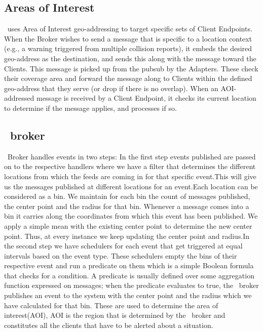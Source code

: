 \subsection{Areas of Interest}
\label{sec:aoi}

\name~uses Area of Interest geo-addressing to target specific sets
of Client Endpoints.  When the Broker wishes to send a message that is
specific to a location context (e.g., a warning triggered from
multiple collision reports), it embeds the desired geo-address as the
destination, and sends this along with the message toward the
Clients. This message is picked up from the pubsub by the Adapters.
These check their coverage area and forward the message along to
Clients within the defined geo-address that they serve (or drop if
there is no overlap).  When an AOI-addressed message is received by a
Client Endpoint, it checks its current location to determine if the
message applies, and processes if so.

\subsection{\name~broker}
  
\name~Broker handles events in two steps: In the first step events
published are passed on to the respective handlers where we have a
filter that determines the different locations from which the feeds
are coming in for that specific event.This will give us the messages
published at different locations for an event.Each location can be
considered as a bin. We maintain for each bin the count of messages
published, the center point and the radius for that bin.  Whenever a
message comes into a bin it carries along the coordinates from which
this event has been published. We apply a simple mean with the
existing center point to determine the new center point. Thus, at
every instance we keep updating the center point and radius.In the
second step we have schedulers for each event that get triggered at
equal intervals based on the event type.  These schedulers empty the
bins of their respective event and run a predicate on them which is a
simple Boolean formula that checks for a condition.  A predicate is
usually defined over some aggregation function expressed on messages;
when the predicate evaluates to true, the \name~broker publishes an
event to the system with the center point and the radius which we have
calculated for that bin. These are used to determine the area of
interest(AOI), AOI is the region that is determined by the \name~broker
and constitutes all the clients that have to be alerted about a
situation.

